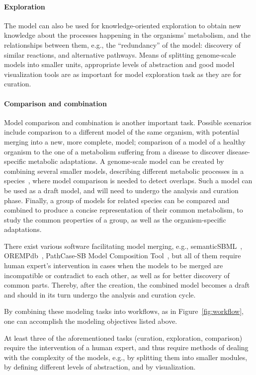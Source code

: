 \documentclass{bmcart}
\begin{document}
\paragraph{Exploration}
The model can also be used for knowledge-oriented exploration to obtain new knowledge about the processes happening in the organisms' metabolism, and the relationships between them, e.g., the ``redundancy'' of the model: discovery of similar reactions, and alternative pathways. 
Means of splitting genome-scale models into smaller units, appropriate levels of abstraction and good model visualization tools are as important for model exploration task as they are for curation.

\paragraph{Comparison and combination}
Model comparison and combination is another important task. Possible scenarios include comparison to a different model of the same organism, with potential merging into a new, more complete, model; comparison of a model of a healthy organism to the one of a metabolism suffering from a disease to discover disease-specific metabolic adaptations.
A genome-scale model can be created by combining several smaller models, describing different metabolic processes in a species~\cite{Schulz2006}, where model comparison is needed to detect overlaps. Such a model can be used as a draft model, and will need to undergo the analysis and curation phase.
Finally, a group of models for related species can be compared and combined to produce a concise representation of their common metabolism, to study the common properties of a group, as well as the organism-specific adaptations.
 
There exist various software facilitating model merging, e.g.,  semanticSBML~\cite{Krause2010}, OREMPdb~\cite{Umeton2012}, PathCase-SB Model Composition Tool~\cite{Coskun2013}, but all of them require human expert's intervention in cases when the models to be merged are incompatible or contradict to each other, as well as for better discovery of common parts. Thereby, after the creation, the combined model becomes a draft and should in its turn undergo the analysis and curation cycle.

By combining these modeling tasks into workflows, as in Figure~\ref{fig:workflow}, one can accomplish the modeling objectives listed above.

At least three of the aforementioned tasks (curation, exploration, comparison) require the intervention of a human expert, and thus require methods of dealing with the complexity of the models, e.g., by splitting them into smaller modules, by defining different levels of abstraction, and by visualization.
\end{document}
